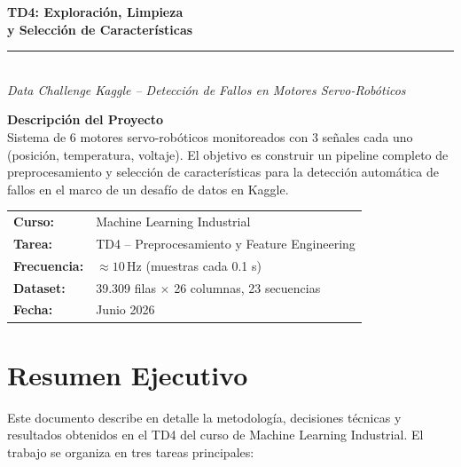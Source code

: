 \documentclass[12pt,a4paper]{article}
\begin{document}
\begin{titlepage}
  \thispagestyle{empty}
  \begin{center}
    \vspace*{1.5cm}
    {\LARGE\bfseries\color{myblue}
      TD4: Exploración, Limpieza\\[0.3em]
      y Selección de Características}\\[1.2em]
    \rule{0.8\linewidth}{1.5pt}\\[0.8em]
    {\large\itshape Data Challenge Kaggle –
      Detección de Fallos en Motores Servo-Robóticos}\\[2em]

    \begin{tcolorbox}[colback=mygray, colframe=myblue!40, width=0.85\linewidth]
      \centering
      \textbf{Descripción del Proyecto}\\[0.5em]
      Sistema de 6 motores servo-robóticos monitoreados con 3 señales cada uno
      (posición, temperatura, voltaje). El objetivo es construir un pipeline
      completo de preprocesamiento y selección de características para la
      detección automática de fallos en el marco de un desafío de datos
      en Kaggle.
    \end{tcolorbox}

    \vfill
    \begin{tabular}{ll}
      \textbf{Curso:}      & Machine Learning Industrial\\
      \textbf{Tarea:}      & TD4 – Preprocesamiento y Feature Engineering\\
      \textbf{Frecuencia:} & $\approx 10\,\text{Hz}$ (muestras cada 0.1 s)\\
      \textbf{Dataset:}    & 39.309 filas $\times$ 26 columnas, 23 secuencias\\
      \textbf{Fecha:}      & Junio 2026\\
    \end{tabular}
  \end{center}
\end{titlepage}

\section*{Resumen Ejecutivo}

Este documento describe en detalle la metodología, decisiones técnicas y resultados
obtenidos en el TD4 del curso de Machine Learning Industrial.
El trabajo se organiza en tres tareas principales:
\end{document}
